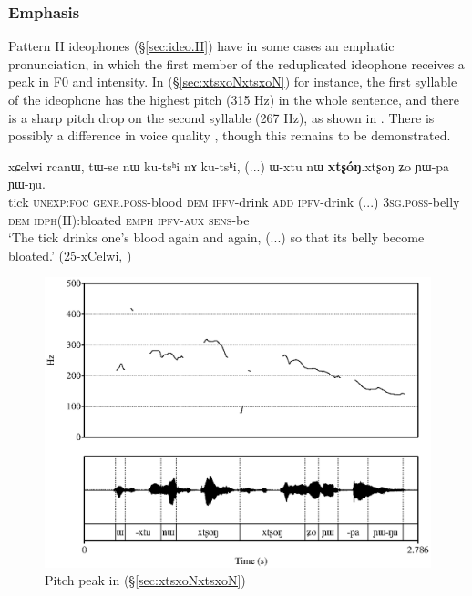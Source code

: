 \subsubsection{Emphasis} \label{sec:emphatic.idph}
Pattern II ideophones (§\ref{sec:ideo.II}) have in some cases an emphatic pronunciation, in which the first member of the reduplicated ideophone receives a peak in F0 and intensity. In (§\ref{sec:xtsxoNxtsxoN}) for instance, the first syllable of the ideophone  has the highest pitch (315 Hz) in the whole sentence, and there is a sharp pitch drop on the second syllable (267 Hz), as shown in . There is possibly a difference in voice quality \citep{japhug14ideophones}, though this remains to be demonstrated.


\begin{exe}
\ex \label{sec:xtsxoNxtsxoN}
\gll xɕelwi rcanɯ, tɯ-se nɯ ku-tsʰi nɤ ku-tsʰi, (...) ɯ-xtu nɯ \textbf{xtʂóŋ}.xtʂoŋ ʑo ɲɯ-pa ɲɯ-ŋu. \\
tick \textsc{unexp}:\textsc{foc} \textsc{genr}.\textsc{poss}-blood \textsc{dem} \textsc{ipfv}-drink \textsc{add} \textsc{ipfv}-drink (...) \textsc{3sg}.\textsc{poss}-belly \textsc{dem} \textsc{idph}(II):bloated \textsc{emph} \textsc{ipfv}-\textsc{aux} \textsc{sens}-be \\
\glt `The tick drinks one's blood again and again, (...) so that its belly become bloated.' (25-xCelwi, )
\end{exe}


\begin{figure}
\caption{Pitch peak in (§\ref{sec:xtsxoNxtsxoN})} \label{fig:xtsxoN}
\includegraphics[width=\textwidth]{xtsxoN.eps}
\end{figure}

